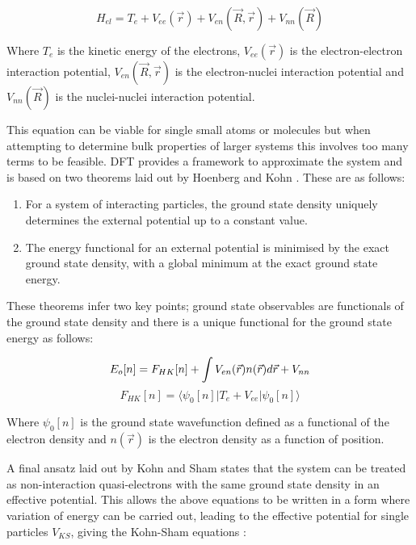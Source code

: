 \documentclass[a4paper,12pt]{article}
\begin{document}
\begin{equation}
H_{el} = T_e + V_{ee}(\vec{r}) + V_{en}(\vec{R}, \vec{r}) + V_{nn}(\vec{R})
\end{equation}

\smallskip
\noindent Where $T_e$ is the kinetic energy of the electrons, $V_{ee}(\vec{r})$ is the electron-electron interaction potential, $V_{en}(\vec{R}, \vec{r})$ is the electron-nuclei interaction potential and $V_{nn}(\vec{R})$ is the nuclei-nuclei interaction potential.

\bigskip
\noindent This equation can be viable for single small atoms or molecules but when attempting to determine bulk properties of larger systems this involves too many terms to be feasible. DFT provides a framework to approximate the system and is based on two theorems laid out by Hoenberg and Kohn \cite{hk_thm}. These are as follows:

\begin{enumerate}
	\item For a system of interacting particles, the ground state density uniquely determines the external potential up to a constant value.

	\item The energy functional for an external potential is minimised by the exact ground state density, with a global minimum at the exact ground state energy.
\end{enumerate}

\noindent These theorems infer two key points; ground state observables are functionals of the ground state density and there is a unique functional for the ground state energy as follows:

\begin{equation}
E_o[n] = F_{HK}[n] + \int V_{en}(\vec{r})n(\vec{r})d\vec{r} + V_{nn} \\
\end{equation}
\[
F_{HK}[n] = \langle\psi_0[n]|T_e + V_{ee}|\psi_0[n]\rangle
\]

\smallskip
\noindent Where $\psi_0[n]$ is the ground state wavefunction defined as a functional of the electron density and $n(\vec{r})$ is the electron density as a function of position.

\bigskip
\noindent A final ansatz laid out by Kohn and Sham states that the system can be treated as non-interaction quasi-electrons with the same ground state density in an effective potential. This allows the above equations to be written in a form where variation of energy can be carried out, leading to the effective potential for single particles $V_{KS}$, giving the Kohn-Sham equations \cite{ks_eqns}:
\end{document}
